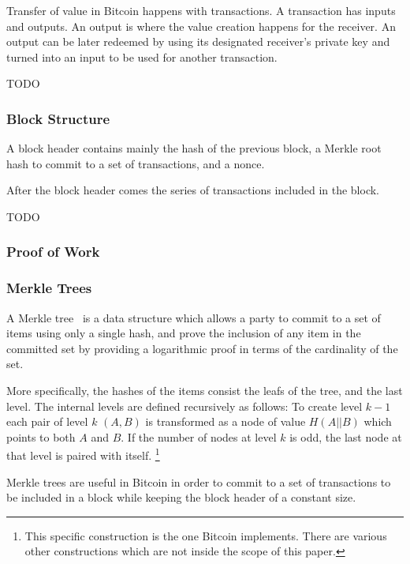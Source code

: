 \documentclass[11pt]{llncs}
\begin{document}
Transfer of value in Bitcoin happens with transactions. A transaction has
inputs and outputs. An output is where the value creation happens for the
receiver. An output can be later redeemed by using its designated receiver's
private key and turned into an input to be used for another transaction.

TODO

\subsubsection{Block Structure}
A block header contains mainly the hash of the previous block, a Merkle root
hash to commit to a set of transactions, and a nonce.

After the block header comes the series of transactions included in the block.

TODO

\subsubsection{Proof of Work}
\subsubsection{Merkle Trees}
A Merkle tree~\cite{merkle} is a data structure which allows a party to
commit to a set of items using only a single hash, and prove the inclusion of
any item in the committed set by providing a logarithmic proof in terms of the
cardinality of the set.

More specifically, the hashes of the items consist the leafs of the tree, and
the last level. The internal levels are defined recursively as follows: To
create level $k-1$ each pair of level $k$ $(A, B)$ is transformed as a node
of value $H(A || B)$ which points to both $A$ and $B$. If the number of nodes
at level $k$ is odd, the last node at that level is paired with itself.
\footnote{This specific construction is the one Bitcoin implements. There are
various other constructions which are not inside the scope of this paper.}

Merkle trees are useful in Bitcoin in order to commit to a set of
transactions to be included in a block while keeping the block header of a
constant size.
\end{document}
